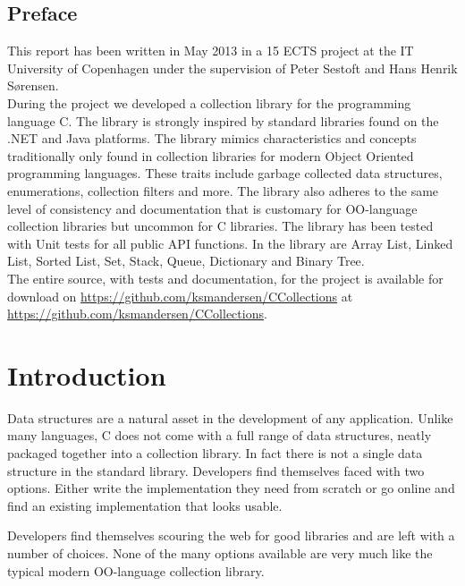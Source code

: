 \documentclass[table]{ituthesis}
\begin{document}
\thetitlepage
\clearpage

\section*{Preface}\label{sec:preface}

This report has been written in May 2013 in a 15 ECTS project at the IT University of Copenhagen under the supervision of Peter Sestoft and Hans Henrik S\o{}rensen.\\

During the project we developed a collection library for the programming language C. The library is strongly inspired by standard libraries found on the .NET and Java platforms. The library mimics characteristics and concepts traditionally only found in collection libraries for modern Object Oriented programming languages. These traits include garbage collected data structures, enumerations, collection filters and more. The library also adheres to the same level of consistency and documentation that is customary for \ac{OO}-language collection libraries but uncommon for C libraries. The library has been tested with Unit tests for all public API functions. In the library are Array List, Linked List, Sorted List, Set, Stack, Queue, Dictionary and Binary Tree.\\

The entire source, with tests and documentation, for the project is available for download on \href{GitHub}{https://github.com/ksmandersen/CCollections} at \href{github.com/ksmandersen/CCollections}{https://github.com/ksmandersen/CCollections}.
\clearpage

\tableofcontents*
\clearpage

\listoffigures*
\listoftables*
\clearpage

\chapter{Introduction}\label{sec:introduction}
Data structures are a natural asset in the development of any application. Unlike many languages, C does not come with a full range of data structures, neatly packaged together into a collection library. In fact there is not a single data structure in the standard library. Developers find themselves faced with two options. Either write the implementation they need from scratch or go online and find an existing implementation that looks usable.

Developers find themselves scouring the web for good libraries and are left with a number of choices. None of the many options available are very much like the typical modern OO-language collection library. 
\end{document}
